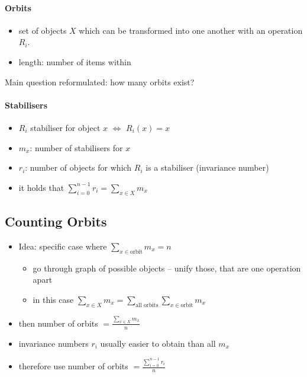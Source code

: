 \documentclass[11pt]{article}
\begin{document}
\paragraph{Orbits}

\begin{itemize}
\item set of objects $ X $ which can be transformed into one another with an operation $ R_i $.
\item length: number of items within
\end{itemize}

Main question reformulated: how many orbits exist?

\paragraph{Stabilisers}
\begin{itemize}
\item $ R_i $ stabiliser for object $ x $ $ \Leftrightarrow $ $ R_i(x) = x $
\item $ m_x $: number of stabilisers for $ x $
\item $ r_i $: number of objects for which $ R_i $ is a stabiliser (invariance number)
\item it holds that $ \sum \limits_{i = 0}^{n-1} r_i = \sum \limits_{x \in X} m_x $
\end{itemize}

\subsection{Counting Orbits}

\begin{itemize}
\item Idea: specific case where $ \sum_{x \in \text{orbit}} m_x = n $
	\begin{itemize}
	\item go through graph of possible objects – unify those, that are one operation apart
	\item in this case $ \sum \limits_{x \in X} m_x = \sum \limits_{\text{all orbits}} \sum \limits_{x \in \text{orbit}} m_x $
	\end{itemize}
\item then number of orbits $ = \frac{\sum \limits_{x \in X} m_x}{n} $
\item invariance numbers $ r_i $ usually easier to obtain than all $ m_x $
\item therefore use number of orbits $ = \frac{\sum \limits_{i = 0}^{n - 1} r_i}{n} $
\end{itemize}
\end{document}
